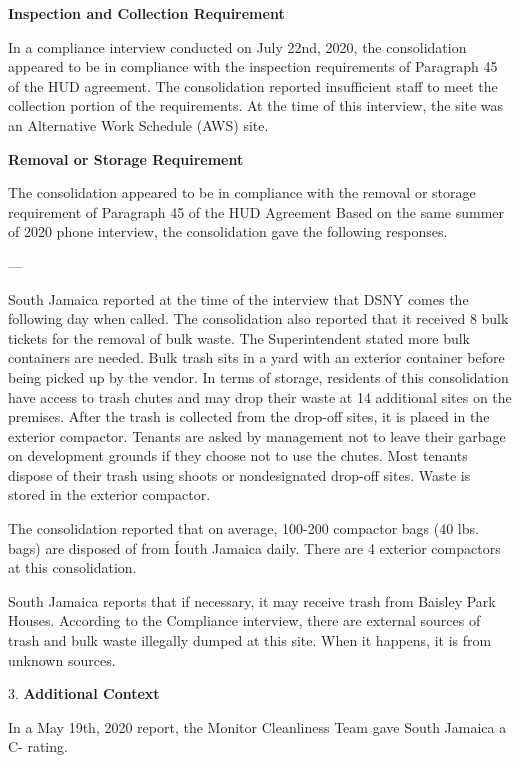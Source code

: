 
\textbf{Inspection and Collection Requirement}

In a compliance interview conducted on July 22nd, 2020, the consolidation appeared to be in compliance with the inspection requirements of Paragraph 45 of the HUD agreement. The consolidation reported insufficient staff to meet the collection portion of the requirements. At the time of this interview, the site was an Alternative Work Schedule (AWS) site. 

\textbf{Removal or Storage Requirement}

The consolidation appeared to be in compliance with the  removal or storage requirement of Paragraph  45 of the HUD Agreement Based on the same summer of  2020 phone interview, the consolidation gave the following responses.

---

South Jamaica reported at the time of the interview that DSNY comes the following day when called. The consolidation also reported that it received 8 bulk tickets for the removal of bulk waste. The Superintendent stated more bulk containers are needed. Bulk trash sits in a yard with an exterior container before being picked up by the vendor. In terms of storage, residents of this consolidation have access to trash chutes and may drop their waste at 14 additional sites on the premises. After the trash is collected from the drop-off sites, it is placed in the exterior compactor. Tenants are asked by management not to leave their garbage on development grounds if they choose not to use the chutes. Most tenants dispose of their trash using shoots or nondesignated drop-off sites. Waste is stored in the exterior compactor. 

The consolidation reported that on average, 100-200 compactor bags (40 lbs. bags) are disposed of from Íouth Jamaica daily. There are 4 exterior compactors at this consolidation.

South Jamaica reports that if necessary, it may receive trash from Baisley Park Houses. According to the Compliance interview, there are external sources of trash and bulk waste illegally dumped at this site. When it happens, it is from unknown sources. 

3. \textbf{Additional Context} 

In a May 19th, 2020 report, the Monitor Cleanliness Team gave South Jamaica a C- rating. 
